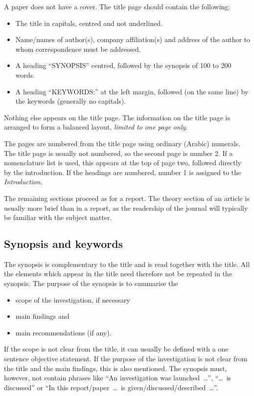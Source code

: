 \documentclass[a5paper, 10pt]{article}
\newcommand{\subsectionname}[1]{\emph{#1}}
\begin{document}
A paper does not have a cover.  The title page should contain the
following:
\begin{itemize}
\item The title in capitals, centred and not underlined.
\item Name/names of author(s), company affiliation(s) and address of
  the author to whom correspondence must be addressed.
\item A heading ``SYNOPSIS'' centred, followed by the synopsis of 100 to
  200 words.
\item A heading ``KEYWORDS:'' at the left margin, followed (on the same
  line) by the keywords (generally no capitals).
\end{itemize}

Nothing else appears on the title page.  The information on the title
page is arranged to form a balanced layout, \emph{limited to one page only}.

The pages are numbered from the title page using ordinary (Arabic)
numerals.  The title page is usually not numbered, so the second page
is number 2.  If a nomenclature list is used, this appears at the top
of page two, followed directly by the introduction.  If the headings
are numbered, number 1 is assigned to
the \subsectionname{Introduction}.  

The remaining sections proceed as for a report.  The theory section of
an article is usually more brief than in a report, as the readership
of the journal will typically be familiar with the subject matter.

\subsection{Synopsis and keywords}
\label{sec:synopsis-keywords}
The synopsis is complementary to the title and is read together with
the title.  All the elements which appear in the title need therefore
not be repeated in the synopsis.  The purpose of the synopsis is to
summarise the
\begin{itemize}
\item scope of the investigation, if necessary
\item main findings and
\item main recommendations (if any).  
\end{itemize}
If the scope is not clear from the title, it can usually be defined
with a one sentence objective statement.  If the purpose of the
investigation is not clear from the title and the main findings, this
is also mentioned.  The synopsis must, however, not contain phrases
like ``An investigation was launched~\dots'', ``\dots~is discussed'' or
``In this report/paper~\dots~is given/discussed/described~\dots''.
\end{document}

